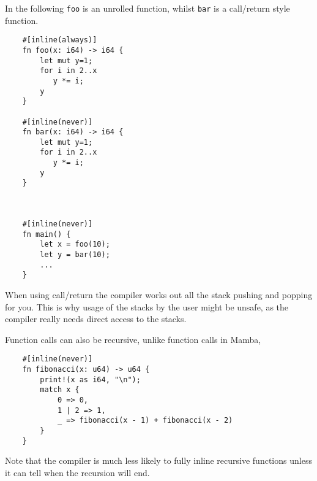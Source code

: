 In the following \verb|foo| is an unrolled function,
whilst \verb|bar| is a call/return style function.

\begin{lstlisting}
    #[inline(always)]
    fn foo(x: i64) -> i64 {
        let mut y=1;
        for i in 2..x
           y *= i;
        y
    }

    #[inline(never)]
    fn bar(x: i64) -> i64 {
        let mut y=1;
        for i in 2..x
           y *= i;
        y
    }



    #[inline(never)]
    fn main() {
        let x = foo(10);
        let y = bar(10);
        ...
    }
\end{lstlisting}
When using call/return the compiler works out all the stack pushing
and popping for you.
This is why usage of the stacks by the user might be unsafe, as the
compiler really needs direct access to the stacks.

Function calls can also be recursive, unlike function calls in Mamba,
\begin{lstlisting}
    #[inline(never)]
    fn fibonacci(x: u64) -> u64 {
        print!(x as i64, "\n");
        match x {
            0 => 0,
            1 | 2 => 1,
            _ => fibonacci(x - 1) + fibonacci(x - 2)
        }
    }
\end{lstlisting}
Note that the compiler is much less likely to fully inline recursive
functions unless it can tell when the recursion will end.
